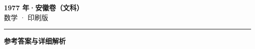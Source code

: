 \documentclass[zihao=5, a4paper]{ctexart}
\begin{document}
\begin{center}
  {\Large\bfseries 1977 年·安徽卷（文科）}\\[4pt]
  {\large 数学 · 印刷版}
\end{center}
\medskip
{}

\par\bigskip\hrule\bigskip
{}
\begin{center}{\large\bfseries 参考答案与详细解析}\end{center}
\smallskip

\end{document}
